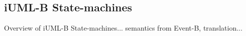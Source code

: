
\subsection{iUML-B State-machines}
\label{sec:iumlb}

Overview of iUML-B State-machines... semantics from Event-B, translation...

